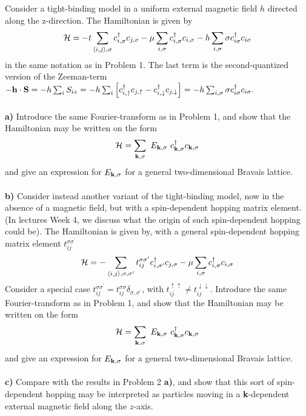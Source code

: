 \begin{problem}
	Consider a tight-binding model in a uniform external magnetic field $h$ directed along the z-direction.
	The Hamiltonian is given by 
	\begin{eqnarray}
		\mathcal{H} = - t \sum_{\langle i,j \rangle, \sigma} c^{\dagger}_{i,\sigma} c_{j,\sigma} - \mu   \sum_{ i, \sigma} c^{\dagger}_{i,\sigma} c_{i,\sigma}
		- h \sum_{i, \sigma} \sigma c^{\dagger}_{i \sigma}  c_{i \sigma}  
		\nonumber 
	\end{eqnarray}
	in the same notation as in Problem 1. The last term is the second-quantized version of the Zeeman-term 
	$- {\bf h} \cdot {\bf S} = - h \sum_i S_{i z} = - h \sum_{i} \left[ c^{\dagger}_{i,\uparrow} c_{j,\uparrow}- c^{\dagger}_{i,\downarrow} c_{j,\downarrow} \right] =-  h \sum_{i, \sigma} \sigma c^{\dagger}_{i \sigma}  c_{i \sigma}.$
	\ \\
	\ \\
	{\bf a)} Introduce the same Fourier-transform as in Problem 1, and show that the Hamiltonian may be written on the form
	\begin{eqnarray}
		\mathcal{H} = \sum_{{\bf k},\sigma} ~ E_{\bf k, \sigma} ~ c^{\dagger}_{{\bf k},\sigma} c_{{\bf k},\sigma}  \nonumber 
	\end{eqnarray}
	and give an expression for $E_{{\bf k},\sigma}$ for a general two-dimensional Bravais lattice. 
	\ \\
	\ \\
	{\bf b)}  Consider instead  another variant of the tight-binding model, now in the absence of a magnetic field, but with a spin-dependent hopping matrix element. (In lectures Week 4, we discuss what the origin of such spin-dependent hopping could be). The Hamiltonian is given by, with a general spin-dependent hopping matrix element $ t^{\sigma \sigma^{\prime}}_{ij}$
	\begin{eqnarray}
		\mathcal{H} = -  \sum_{\langle i,j \rangle, \sigma, \sigma^{\prime}} t^{\sigma \sigma^{\prime}}_{ij}c^{\dagger}_{i,\sigma^{\prime}} c_{j,\sigma} - \mu   \sum_{ i, \sigma} c^{\dagger}_{i,\sigma} c_{i,\sigma}
		\nonumber 
	\end{eqnarray}
	Consider a special case $ t^{\sigma \sigma^{\prime}}_{ij} = t^{\sigma \sigma}_{ij} \delta_{\sigma,\sigma^{\prime}}$, with 
	$t_{ij}^{\uparrow \uparrow} \neq t_{ij}^{\downarrow \downarrow}$.  Introduce the same Fourier-transform as in Problem 1, and show that the Hamiltonian may be written on the form
	\begin{eqnarray}
		\mathcal{H} = \sum_{{\bf k},\sigma} ~ E_{\bf k, \sigma} ~ c^{\dagger}_{{\bf k},\sigma} c_{{\bf k},\sigma}  \nonumber 
	\end{eqnarray}
	and give an expression for $E_{{\bf k},\sigma}$ for a general two-dimensional Bravais lattice. 
	\ \\
	\ \\
	{\bf c)} Compare with the results in Problem 2 {\bf a)}, and show that this sort of spin-dependent hopping may be interpreted as particles moving in  a {\bf k}-dependent external magnetic field along the $z$-axis.  
\end{problem}

